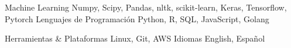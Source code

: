 

\begin{cvskills}


  \cvskill
  {Machine Learning} %
  {Numpy, Scipy, Pandas, nltk, scikit-learn, Keras, Tensorflow, Pytorch} %
  \cvskill
    {Lenguajes de Programación} %
    {Python, R, SQL, JavaScript, Golang} %
    
  \cvskill
    {Herramientas \& Plataformas} %
    {Linux, Git, AWS}
  \cvskill
    {Idiomas} %
    {English, Español} %

\end{cvskills}
